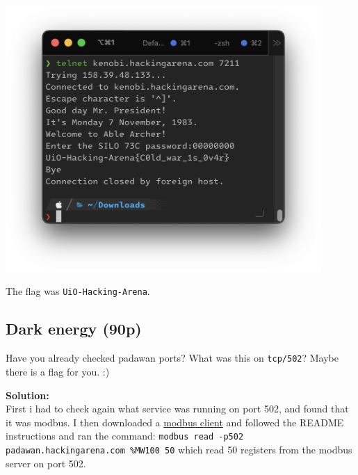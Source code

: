 \begin{center}
    \includegraphics[width=12cm]{img/Get in touch with services/Minuteman/Skjermbilde 2023-10-26 kl. 15.13.55.png}
\end{center}

The flag was \texttt{UiO-Hacking-Arena}.

\newpage
\subsection{Dark energy (90p)}
Have you already checked padawan ports? What was this on \texttt{tcp/502}? Maybe there is a flag for you. :)

\textbf{Solution:}\\
First i had to check again what service was running on port 502, and found that it was modbus.
I then downloaded a \href{https://github.com/tallakt/modbus-cli}{modbus client} and followed the README instructions and ran the command:
\texttt{modbus read -p502 padawan.hackingarena.com \%MW100 50}
which read 50 registers from the modbus server on port 502.


